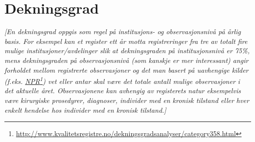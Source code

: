 \documentclass[norsk, a4paper, twocolumn]{report}
\newcommand{\guide}[1] {
	\textit{[\textcolor{guidegray}{#1}]}
	}
\begin{document}






\chapter{Dekningsgrad}\label{cha:dek}

\guide{En dekningsgrad oppgis som regel på institusjons- og observasjonsnivå på 
årlig basis. For eksempel kan et register ett år motta registreringer fra tre
av totalt fire mulige institusjoner/avdelinger slik at dekningsgraden på
institusjonsnivå er 75\%, mens dekningsgraden på observasjonsnivå 
(som kanskje er mer interessant) angir
forholdet mellom registrerte observasjoner og det man basert på uavhengige
kilder (f.eks.
\href{http://www.kvalitetsregistre.no/dekningsgradsanalyser/category358.html}
{NPR}\footnote{\url{http://www.kvalitetsregistre.no/dekningsgradsanalyser/category358.html}})
vet eller antar skal være det totale antall mulige
observasjoner i det aktuelle året. Observasjonene kan avhengig av registerets
natur eksempelvis være kirurgiske prosedyrer, diagnoser, individer med en 
kronisk tilstand eller hver enkelt hendelse hos individer med en kronisk
tilstand.}
\end{document}
